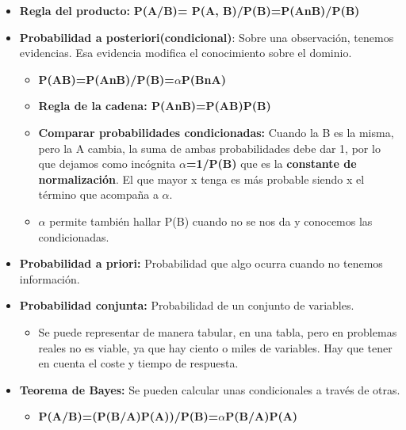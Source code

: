 \documentclass[12pt, twoside, openright]{report} %
\begin{document}
\begin{itemize}
  \item \textbf{Regla del producto:} \textbf{P(A/B)=
    P(A, B)/P(B)=P(AnB)/P(B)}
    \pagebreak
  \item \textbf{Probabilidad a posteriori(condicional)}: Sobre una
    observación, tenemos evidencias. Esa evidencia modifica el
    conocimiento sobre el dominio.
    

    \begin{itemize}
    \item \textbf{P(A\textbar B)=P(AnB)/P(B)=$\alpha$P(BnA)}
      
    \item \textbf{Regla de la cadena: P(AnB)=P(A\textbar B)P(B)}
      
    \item \textbf{Comparar probabilidades condicionadas:} Cuando la B es la
      misma, pero la A cambia, la suma de ambas probabilidades debe dar
      1, por lo que dejamos como incógnita \textbf{$\alpha$=1/P(B)} que es la
      \textbf{constante de normalización}. El que mayor x tenga es más
      probable siendo x el término que acompaña a $\alpha$.
      
    \item $\alpha$ permite también hallar P(B) cuando no se nos da y conocemos las
      condicionadas.
      
    \end{itemize}
  \item \textbf{Probabilidad a priori:} Probabilidad que algo ocurra cuando
    no tenemos información.
    
  \item \textbf{Probabilidad conjunta:} Probabilidad de un conjunto de
    variables.
    

    \begin{itemize}
    \item Se puede representar de manera tabular, en una tabla, pero en
      problemas reales no es viable, ya que hay ciento o miles de
      variables. Hay que tener en cuenta el coste y tiempo de respuesta.
      
    \end{itemize}
  \item \textbf{Teorema de Bayes:} Se pueden calcular unas condicionales a
    través de otras.
    

    \begin{itemize}
    \item \textbf{P(A/B)=(P(B/A)P(A))/P(B)=$\alpha$P(B/A)P(A)}
      

\end{itemize}
\end{itemize}
\end{document}
